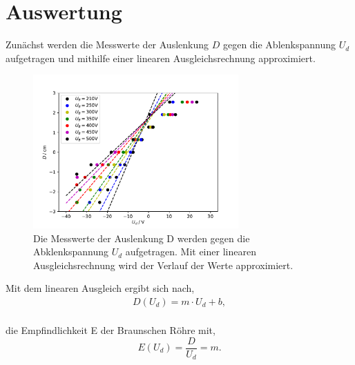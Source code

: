 \section{Auswertung}
\label{sec:Auswertung}
Zunächst werden die Messwerte der Auslenkung $D$ gegen die Ablenkspannung $U_d$ aufgetragen und mithilfe einer linearen 
Ausgleichsrechnung approximiert.
 \begin{figure}[]
     \centering
     \includegraphics[width = 0.7\textwidth]{plots/all.pdf}
     \caption{Die Messwerte der Auslenkung D werden gegen die Abklenkspannung $U_d$ aufgetragen.
              Mit einer linearen Ausgleichsrechnung wird der Verlauf der Werte approximiert.}
     \label{fig:plot1}
 \end{figure}
Mit dem linearen Ausgleich ergibt sich nach,
\begin{align}
    D(U_d) = m\cdot U_d + b  \nonumber, \\
\end{align}

die Empfindlichkeit E der Braunschen Röhre mit,
\begin{equation}
    E(U_d)=\frac{D}{U_d}=m.
\end{equation}

